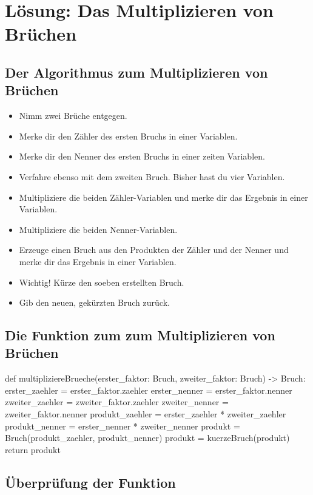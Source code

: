 \section{Lösung: Das Multiplizieren von Brüchen}

\subsection*{Der Algorithmus zum Multiplizieren von Brüchen}

\begin{itemize}
	\item Nimm zwei Brüche entgegen.
	\item Merke dir den Zähler des ersten Bruchs in einer Variablen.
	\item Merke dir den Nenner des ersten Bruchs in einer zeiten Variablen.
	\item Verfahre ebenso mit dem zweiten Bruch. Bisher hast du vier Variablen.
	\item Multipliziere die beiden Zähler-Variablen und merke dir das Ergebnis in einer Variablen.
	\item Multipliziere die beiden Nenner-Variablen.
	\item Erzeuge einen Bruch aus den Produkten der Zähler und der Nenner und merke dir das Ergebnis in einer Variablen. 
	\item Wichtig! Kürze den soeben erstellten Bruch.
	\item Gib den neuen, gekürzten Bruch zurück.
\end{itemize}

\subsection*{Die Funktion zum zum Multiplizieren von Brüchen}

\begin{codePython}
def multipliziereBrueche(erster_faktor: Bruch, zweiter_faktor: Bruch) -> Bruch:
	erster_zaehler = erster_faktor.zaehler
	erster_nenner = erster_faktor.nenner
	zweiter_zaehler = zweiter_faktor.zaehler
	zweiter_nenner = zweiter_faktor.nenner
	produkt_zaehler = erster_zaehler * zweiter_zaehler
	produkt_nenner = erster_nenner * zweiter_nenner
	produkt = Bruch(produkt_zaehler, produkt_nenner)
	produkt = kuerzeBruch(produkt)
	return produkt
\end{codePython}

\subsection*{Überprüfung der Funktion}

